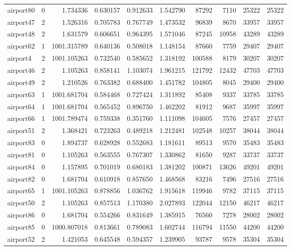 \documentclass[../../../thesis.tex]{subfiles}
\begin{document}
\begin{longtable}{|l|r|r|r|r|r|r|r|r|r|}
airport80 & 0 & 1.734336 & 0.630157 & 0.912633 & 1.542790 & 87292 & 7110 & 25322 & 25322 \\
airport47 & 2 & 1.526316 & 0.705783 & 0.767749 & 1.473532 & 96839 & 8670 & 33957 & 33957 \\
airport48 & 2 & 1.631579 & 0.606651 & 0.964395 & 1.571046 & 87245 & 10958 & 43289 & 43289 \\
airport62 & 1 & 1001.315789 & 0.640136 & 0.508018 & 1.148154 & 87660 & 7759 & 29407 & 29407 \\
airport4 & 2 & 1001.105263 & 0.732540 & 0.585652 & 1.318192 & 100588 & 8179 & 30207 & 30207 \\
airport46 & 2 & 1.105263 & 0.858141 & 1.103074 & 1.961215 & 121792 & 12432 & 47703 & 47703 \\
airport49 & 2 & 1.210526 & 0.763382 & 0.688400 & 1.451782 & 104805 & 8045 & 29400 & 29400 \\
airport63 & 1 & 1001.681704 & 0.584468 & 0.727424 & 1.311892 & 85408 & 9337 & 33785 & 33785 \\
airport64 & 1 & 1001.681704 & 0.565452 & 0.896750 & 1.462202 & 81912 & 9687 & 35997 & 35997 \\
airport66 & 1 & 1001.789474 & 0.759338 & 0.351760 & 1.111098 & 104605 & 7576 & 27457 & 27457 \\
airport51 & 2 & 1.368421 & 0.723263 & 0.489218 & 1.212481 & 102548 & 10257 & 38044 & 38044 \\
airport83 & 0 & 1.894737 & 0.628928 & 0.552683 & 1.181611 & 89513 & 9570 & 35483 & 35483 \\
airport81 & 0 & 1.105263 & 0.563555 & 0.767307 & 1.330862 & 81650 & 9287 & 33737 & 33737 \\
airport84 & 0 & 1.157895 & 0.701019 & 0.680183 & 1.381202 & 100871 & 13626 & 49201 & 49201 \\
airport82 & 0 & 1.681704 & 0.610918 & 0.857650 & 1.468568 & 83216 & 7496 & 27516 & 27516 \\
airport65 & 1 & 1001.105263 & 0.878856 & 1.036762 & 1.915618 & 119946 & 9782 & 37115 & 37115 \\
airport50 & 2 & 1.105263 & 0.857513 & 1.170380 & 2.027893 & 122044 & 12150 & 46217 & 46217 \\
airport86 & 0 & 1.681704 & 0.554266 & 0.831649 & 1.385915 & 76560 & 7278 & 28002 & 28002 \\
airport85 & 0 & 1000.807018 & 0.813661 & 0.789083 & 1.602744 & 116794 & 11550 & 44200 & 44200 \\
airport52 & 2 & 1.421053 & 0.645548 & 0.594357 & 1.239905 & 93787 & 9578 & 35304 & 35304 \\

\end{longtable}
\end{document}
